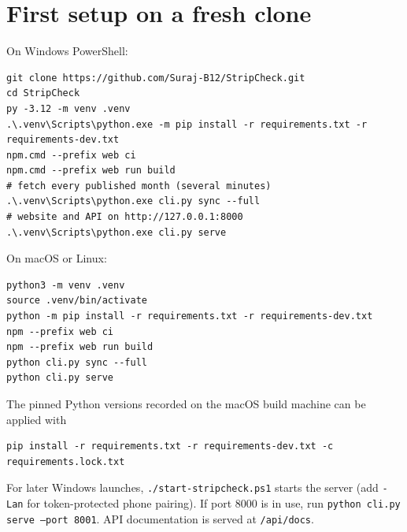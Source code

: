 \section{First setup on a fresh clone}
\label{sec:app-run-setup}

\par\smallskip\noindent\begin{minipage}[t]{\linewidth}On Windows PowerShell:\par\vspace{2pt}\begin{lstlisting}[language={},numbers=none,breakatwhitespace=true]
git clone https://github.com/Suraj-B12/StripCheck.git
cd StripCheck
py -3.12 -m venv .venv
.\.venv\Scripts\python.exe -m pip install -r requirements.txt -r requirements-dev.txt
npm.cmd --prefix web ci
npm.cmd --prefix web run build
# fetch every published month (several minutes)
.\.venv\Scripts\python.exe cli.py sync --full
# website and API on http://127.0.0.1:8000
.\.venv\Scripts\python.exe cli.py serve
\end{lstlisting}\end{minipage}\par\smallskip\noindent

On macOS or Linux:
\par\smallskip\noindent\begin{minipage}[t]{\linewidth}\vspace{-\topsep}\begin{lstlisting}[language={},numbers=none,breakatwhitespace=true]
python3 -m venv .venv
source .venv/bin/activate
python -m pip install -r requirements.txt -r requirements-dev.txt
npm --prefix web ci
npm --prefix web run build
python cli.py sync --full
python cli.py serve
\end{lstlisting}\end{minipage}\par\smallskip\noindent

The pinned Python versions recorded on the macOS build machine can be applied with
\par\smallskip\noindent\begin{minipage}[t]{\linewidth}\vspace{-\topsep}\begin{lstlisting}[language={},numbers=none,breakatwhitespace=true]
pip install -r requirements.txt -r requirements-dev.txt -c requirements.lock.txt
\end{lstlisting}\end{minipage}\par\smallskip\noindent
For later Windows launches, \texttt{./start-stripcheck.ps1} starts the server (add \texttt{-Lan} for token-protected phone pairing). If port 8000 is in use, run \texttt{python cli.py serve --port 8001}. API documentation is served at \texttt{/api/docs}.


